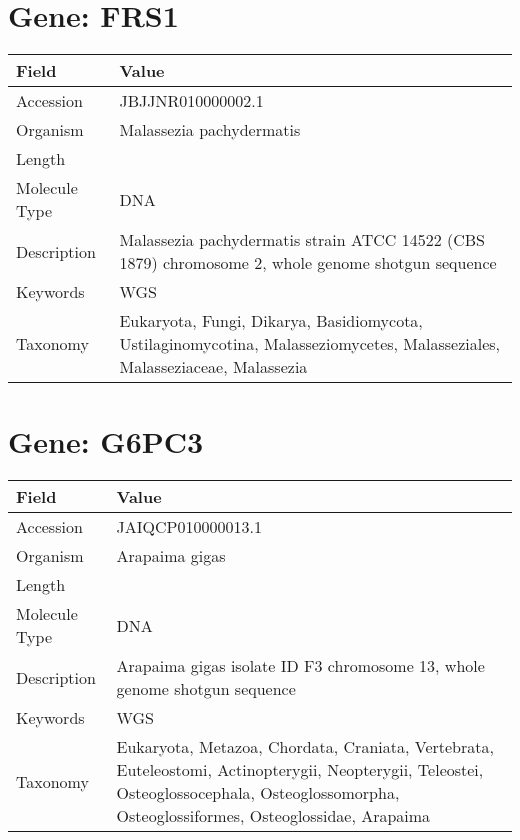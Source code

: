 \documentclass[10pt]{article}
\begin{document}
\section{Gene: FRS1}
{\footnotesize
\begin{longtable}{>{\raggedright\arraybackslash}p{4.5cm} >{\raggedright\arraybackslash}p{11.5cm}}
\textbf{Field} & \textbf{Value} \\
\hline
Accession & JBJJNR010000002.1 \\
Organism & Malassezia pachydermatis \\
Length & 1741169 \\
Molecule Type & DNA \\
Description & Malassezia pachydermatis strain ATCC 14522 (CBS 1879) chromosome 2, whole genome shotgun sequence \\
Keywords & WGS \\
Taxonomy & Eukaryota, Fungi, Dikarya, Basidiomycota, Ustilaginomycotina, Malasseziomycetes, Malasseziales, Malasseziaceae, Malassezia \\
\end{longtable}
}

\vspace{1em}
\section{Gene: G6PC3}
{\footnotesize
\begin{longtable}{>{\raggedright\arraybackslash}p{4.5cm} >{\raggedright\arraybackslash}p{11.5cm}}
\textbf{Field} & \textbf{Value} \\
\hline
Accession & JAIQCP010000013.1 \\
Organism & Arapaima gigas \\
Length & 24166628 \\
Molecule Type & DNA \\
Description & Arapaima gigas isolate ID F3 chromosome 13, whole genome shotgun sequence \\
Keywords & WGS \\
Taxonomy & Eukaryota, Metazoa, Chordata, Craniata, Vertebrata, Euteleostomi, Actinopterygii, Neopterygii, Teleostei, Osteoglossocephala, Osteoglossomorpha, Osteoglossiformes, Osteoglossidae, Arapaima \\
\end{longtable}
}

\vspace{1em}
\end{document}
